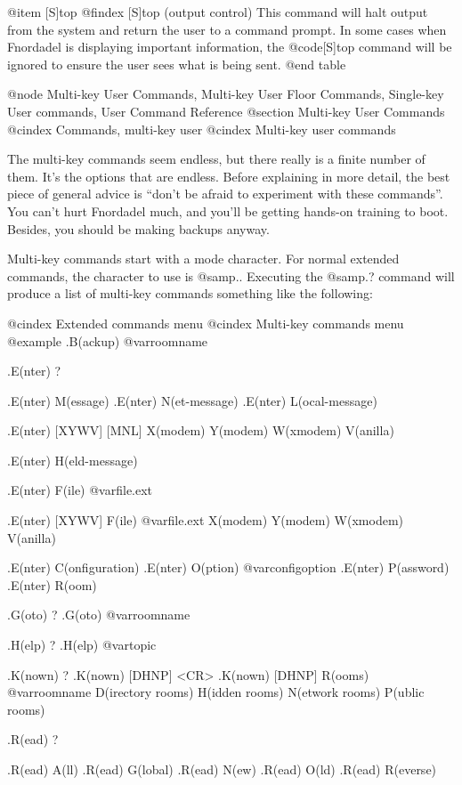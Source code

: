 @item [S]top
@findex [S]top (output control)
This command will halt output from the system and
return the user to a command prompt.  In some cases when
Fnordadel is displaying important information, the @code{[S]top}
command will be ignored to ensure the user sees what is being
sent.
@end table

@node Multi-key User Commands, Multi-key User Floor Commands, Single-key User commands, User Command Reference
@section Multi-key User Commands
@cindex Commands, multi-key user
@cindex Multi-key user commands

The multi-key commands seem endless, but there really is a finite number of
them.  It's the options that are endless.  Before explaining in
more detail, the best piece of general advice is ``don't be afraid to
experiment with these commands''.  You can't hurt Fnordadel much, and you'll
be getting hands-on training to boot.  Besides, you should be making backups
anyway.

Multi-key commands start with a mode character.  For normal extended commands,
the character to use is @samp{.}.  Executing the @samp{.?} command will produce
a list of multi-key commands something like the following:

@cindex Extended commands menu
@cindex Multi-key commands menu
@example
.B(ackup) @var{roomname}

.E(nter) ?

.E(nter) M(essage)
.E(nter) N(et-message)
.E(nter) L(ocal-message)

.E(nter) [XYWV] [MNL]
         X(modem)
         Y(modem)
         W(xmodem)
         V(anilla)

.E(nter) H(eld-message)

.E(nter) F(ile) @var{file.ext}

.E(nter) [XYWV] F(ile) @var{file.ext}
         X(modem)
         Y(modem)
         W(xmodem)
         V(anilla)

.E(nter) C(onfiguration)
.E(nter) O(ption) @var{configoption}
.E(nter) P(assword)
.E(nter) R(oom)

.G(oto) ?
.G(oto) @var{roomname}

.H(elp) ?
.H(elp) @var{topic}

.K(nown) ?
.K(nown) [DHNP] <CR>
.K(nown) [DHNP] R(ooms) @var{roomname}
         D(irectory rooms)
         H(idden rooms)
         N(etwork rooms)
         P(ublic rooms)

.R(ead) ?

.R(ead) A(ll)
.R(ead) G(lobal)
.R(ead) N(ew)
.R(ead) O(ld)
.R(ead) R(everse)


